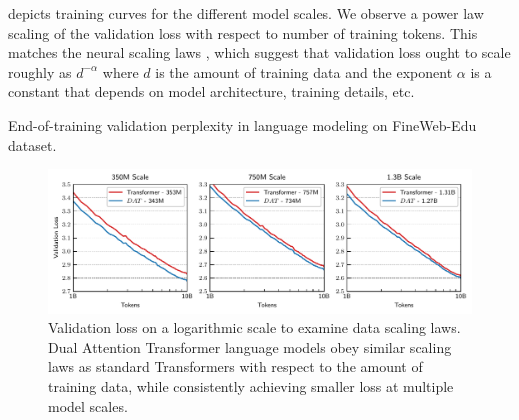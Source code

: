  depicts training curves for the different model scales. We observe a power law scaling of the validation loss with respect to number of training tokens. This matches the neural scaling laws \citep{kaplan2020scalinglawsneurallanguage}, which suggest that validation loss ought to scale roughly as $d^{-\alpha}$ where $d$ is the amount of training data and the exponent $\alpha$ is a constant that depends on model architecture, training details, etc.

\begin{table}[h]
    \centering
    \caption{End-of-training validation perplexity in language modeling on FineWeb-Edu dataset.}\label{tab:fineweb_results}
    
\end{table}

\begin{figure}[h]
    \includegraphics[width=\textwidth]{figs/experiments/fineweb/valloss_logtok.pdf}
    \caption{Validation loss on a logarithmic scale to examine data scaling laws. Dual Attention Transformer language models obey similar scaling laws as standard Transformers with respect to the amount of training data, while consistently achieving smaller loss at multiple model scales.}\label{fig:fineweb_training_curves}
\end{figure}






